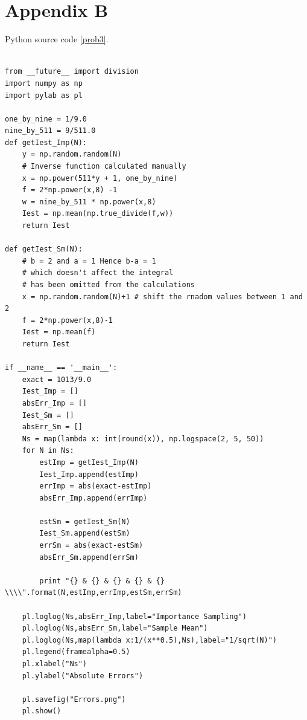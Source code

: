 \documentclass[a4paper,11pt]{article}
\begin{document}
\section{Appendix B}\label{code:problem3}
Python source code \ref{prob3}.
{\footnotesize
\begin{lstlisting}

from __future__ import division
import numpy as np
import pylab as pl

one_by_nine = 1/9.0
nine_by_511 = 9/511.0
def getIest_Imp(N):
    y = np.random.random(N)
    # Inverse function calculated manually
    x = np.power(511*y + 1, one_by_nine)
    f = 2*np.power(x,8) -1
    w = nine_by_511 * np.power(x,8) 
    Iest = np.mean(np.true_divide(f,w))
    return Iest

def getIest_Sm(N):
    # b = 2 and a = 1 Hence b-a = 1 
    # which doesn't affect the integral 
    # has been omitted from the calculations
    x = np.random.random(N)+1 # shift the rnadom values between 1 and 2
    f = 2*np.power(x,8)-1
    Iest = np.mean(f)
    return Iest

if __name__ == '__main__':
    exact = 1013/9.0
    Iest_Imp = []
    absErr_Imp = []
    Iest_Sm = []
    absErr_Sm = []
    Ns = map(lambda x: int(round(x)), np.logspace(2, 5, 50))
    for N in Ns:
        estImp = getIest_Imp(N)
        Iest_Imp.append(estImp)
        errImp = abs(exact-estImp)
        absErr_Imp.append(errImp)

        estSm = getIest_Sm(N)
        Iest_Sm.append(estSm)
        errSm = abs(exact-estSm)
        absErr_Sm.append(errSm)

        print "{} & {} & {} & {} & {} \\\\".format(N,estImp,errImp,estSm,errSm)

    pl.loglog(Ns,absErr_Imp,label="Importance Sampling")
    pl.loglog(Ns,absErr_Sm,label="Sample Mean")
    pl.loglog(Ns,map(lambda x:1/(x**0.5),Ns),label="1/sqrt(N)")
    pl.legend(framealpha=0.5)
    pl.xlabel("Ns")
    pl.ylabel("Absolute Errors")

    pl.savefig("Errors.png")
    pl.show()
\end{lstlisting}
}
\end{document}
